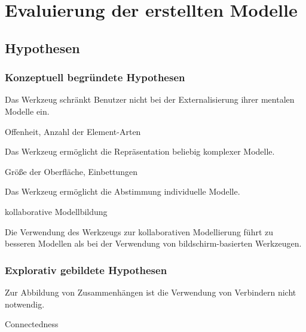 \chapter{Evaluierung der erstellten Modelle} %
\label{cha:eval_modell}

\section{Hypothesen} %
\label{sec:m_hypothesen}

\subsection{Konzeptuell begründete Hypothesen} %
\label{sub:m_konzeptionell_begründete_hypothesen}

\begin{hyp}
	Das Werkzeug schränkt Benutzer nicht bei der Externalisierung ihrer mentalen Modelle ein.
\end{hyp}
Offenheit, Anzahl der Element-Arten
	
\begin{hyp}
	Das Werkzeug ermöglicht die Repräsentation beliebig komplexer Modelle.
\end{hyp}
Größe der Oberfläche, Einbettungen

\begin{hyp}
	Das Werkzeug ermöglicht die Abstimmung individuelle Modelle.
\end{hyp}
kollaborative Modellbildung

\begin{hyp}
	Die Verwendung des Werkzeugs zur kollaborativen Modellierung führt zu besseren Modellen als bei der Verwendung von bildschirm-basierten Werkzeugen.
\end{hyp}


\subsection{Explorativ gebildete Hypothesen} %
\label{sub:m_explorativ_gebildete_hypothesen}

\begin{hyp}
	\label{hyp:keineverbinder}
	Zur Abbildung von Zusammenhängen ist die Verwendung von Verbindern nicht notwendig.
\end{hyp}
Connectedness


